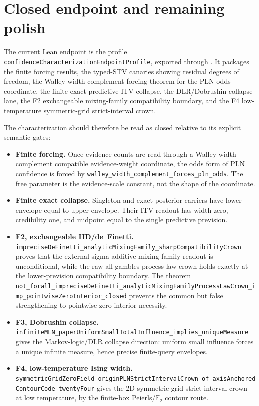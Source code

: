 \documentclass[]{article}
\newcommand{\codepath}[1]{\path{#1}}
\newcommand{\lid}[1]{{\ttfamily\nolinkurl{#1}}}
\begin{document}
\section{Closed endpoint and remaining polish}\label{sec:open}

The current Lean endpoint is the profile
\lid{confidenceCharacterizationEndpointProfile}, exported through
\codepath{Mettapedia.Logic.PLNCanonicalAPI}. It packages the finite forcing
results, the typed-STV canaries showing residual degrees of freedom, the
Walley width-complement forcing theorem for the PLN odds coordinate, the
finite exact-predictive ITV collapse, the DLR/Dobrushin collapse lane, the
F2 exchangeable mixing-family compatibility boundary, and the F4
low-temperature symmetric-grid strict-interval crown.

The characterization should therefore be read as closed relative to its
explicit semantic gates:
\begin{itemize}
\item \textbf{Finite forcing.}
      Once evidence counts are read through a Walley width-complement
      compatible evidence-weight coordinate, the odds form of PLN
      confidence is forced by
      \lid{walley\_width\_complement\_forces\_pln\_odds}. The free
      parameter is the evidence-scale constant, not the shape of the
      coordinate.

\item \textbf{Finite exact collapse.}
      Singleton and exact posterior carriers have lower envelope equal to
      upper envelope. Their ITV readout has width zero, credibility one,
      and midpoint equal to the single predictive prevision.

\item \textbf{F2, exchangeable IID/de~Finetti.}
      \lid{impreciseDeFinetti\_analyticMixingFamily\_sharpCompatibilityCrown}
      proves that the external sigma-additive mixing-family readout is
      unconditional, while the raw all-gambles process-law crown holds
      exactly at the lower-prevision compatibility boundary. The theorem
      \lid{not\_forall\_impreciseDeFinetti\_analyticMixingFamilyProcessLawCrown\_imp\_pointwiseZeroInterior\_closed}
      prevents the common but false strengthening to pointwise zero-interior
      necessity.

\item \textbf{F3, Dobrushin collapse.}
      \lid{infiniteMLN\_paperUniformSmallTotalInfluence\_implies\_uniqueMeasure}
      gives the Markov-logic/DLR collapse direction: uniform small influence
      forces a unique infinite measure, hence precise finite-query envelopes.

\item \textbf{F4, low-temperature Ising width.}
      \lid{symmetricGridZeroField\_originPLNStrictIntervalCrown\_of\_axisAnchoredContourCode\_twentyFour}
      gives the 2D symmetric-grid strict-interval crown at low temperature,
      by the finite-box Peierls/$\mathbb{F}_2$ contour route.
\end{itemize}
\end{document}
